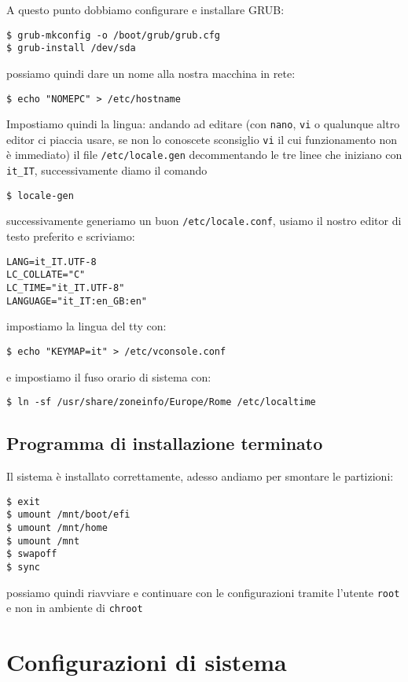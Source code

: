 \documentclass[twoside,italian]{book}
\newcommand{\code}[1]{\texttt{#1}}
\begin{document}
    A questo punto dobbiamo configurare e installare \ac{GRUB}: 
    \begin{lstlisting}
$ grub-mkconfig -o /boot/grub/grub.cfg 
$ grub-install /dev/sda
    \end{lstlisting}
    possiamo quindi dare un nome alla nostra macchina in rete:
    \begin{lstlisting}
$ echo "NOMEPC" > /etc/hostname
    \end{lstlisting}

    Impostiamo quindi la lingua: andando ad editare (con \code{nano}, \code{vi} o qualunque altro editor ci piaccia usare, se non lo conoscete sconsiglio \code{vi} il cui funzionamento non è immediato) il file \code{/etc/locale.gen} decommentando le tre linee che iniziano con \code{it\_IT}, successivamente diamo il comando 
    \begin{lstlisting}
$ locale-gen
    \end{lstlisting}
    successivamente generiamo un buon \code{/etc/locale.conf}, usiamo il nostro editor di testo preferito e scriviamo:

\begin{lstlisting}
LANG=it_IT.UTF-8
LC_COLLATE="C"
LC_TIME="it_IT.UTF-8"
LANGUAGE="it_IT:en_GB:en"
\end{lstlisting}

    impostiamo la lingua del tty con:
\begin{lstlisting}
$ echo "KEYMAP=it" > /etc/vconsole.conf
\end{lstlisting}
    e impostiamo il fuso orario di sistema con:
\begin{lstlisting}
$ ln -sf /usr/share/zoneinfo/Europe/Rome /etc/localtime
\end{lstlisting}

\section {Programma di installazione terminato}

    Il sistema è installato correttamente, adesso andiamo per smontare le partizioni:
\begin{lstlisting}
$ exit
$ umount /mnt/boot/efi
$ umount /mnt/home
$ umount /mnt
$ swapoff
$ sync
\end{lstlisting}
    possiamo quindi riavviare e continuare con le configurazioni tramite l'utente \code{root} e non in ambiente di \code{chroot}

\cleardoublepage
\chapter{Configurazioni di sistema}
\end{document}
